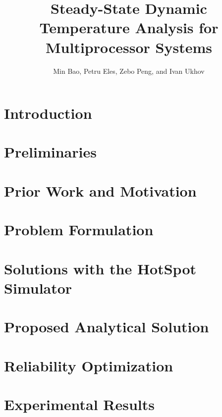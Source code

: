 \documentclass[conference]{IEEEtran}
\title{Steady-State Dynamic Temperature Analysis for Multiprocessor Systems}
\author{Min Bao, Petru Eles, Zebo Peng, and Ivan Ukhov}
\begin{document}
  \maketitle

  \begin{abstract}
    
  \end{abstract}

  \section{Introduction}
  

  \section{Preliminaries} \label{sec:preliminaries}
  

  \section{Prior Work and Motivation} \label{sec:motivation}
  

  \section{Problem Formulation} \label{sec:problem}
  

  \section{Solutions with the HotSpot Simulator} \label{sec:hotspot-solution}
  

  \section{Proposed Analytical Solution} \label{sec:analytical-solution}
  

  \section{Reliability Optimization} \label{sec:reliability}
  

  \section{Experimental Results} \label{sec:results}
  
\end{document}
